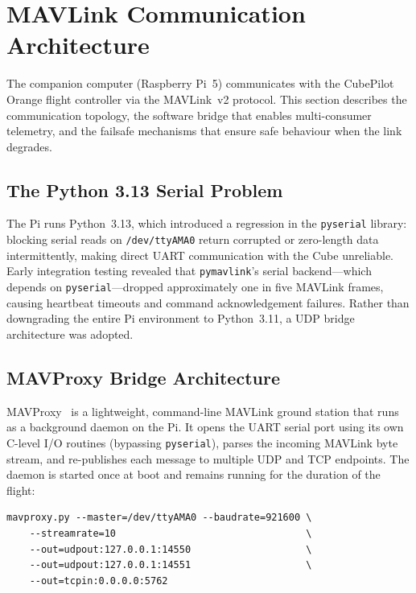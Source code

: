 \section{MAVLink Communication Architecture}\label{sec:comms}

The companion computer (Raspberry Pi~5) communicates with the CubePilot Orange flight controller via the MAVLink~v2 protocol. This section describes the communication topology, the software bridge that enables multi-consumer telemetry, and the failsafe mechanisms that ensure safe behaviour when the link degrades.

\subsection{The Python 3.13 Serial Problem}\label{sec:serial-problem}

The Pi runs Python~3.13, which introduced a regression in the \texttt{pyserial} library: blocking serial reads on \texttt{/dev/ttyAMA0} return corrupted or zero-length data intermittently, making direct UART communication with the Cube unreliable. Early integration testing revealed that \texttt{pymavlink}'s serial backend---which depends on \texttt{pyserial}---dropped approximately one in five MAVLink frames, causing heartbeat timeouts and command acknowledgement failures. Rather than downgrading the entire Pi environment to Python~3.11, a UDP bridge architecture was adopted.

\subsection{MAVProxy Bridge Architecture}\label{sec:mavproxy-bridge}

MAVProxy~\cite{mavproxy} is a lightweight, command-line MAVLink ground station that runs as a background daemon on the Pi. It opens the UART serial port using its own C-level I/O routines (bypassing \texttt{pyserial}), parses the incoming MAVLink byte stream, and re-publishes each message to multiple UDP and TCP endpoints. The daemon is started once at boot and remains running for the duration of the flight:

\begin{verbatim}
mavproxy.py --master=/dev/ttyAMA0 --baudrate=921600 \
    --streamrate=10                                 \
    --out=udpout:127.0.0.1:14550                    \
    --out=udpout:127.0.0.1:14551                    \
    --out=tcpin:0.0.0.0:5762
\end{verbatim}

